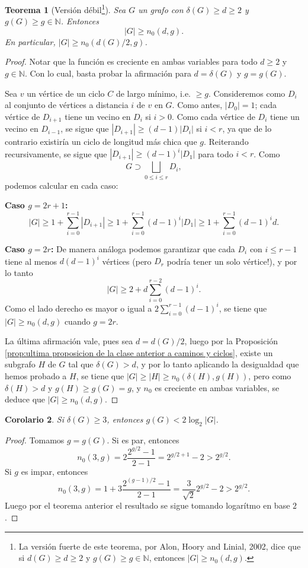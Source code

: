 \documentclass[12pt]{report}
\theoremstyle{plain}
\newtheorem{theorem}{Teorema}[section]
\newtheorem{corollary}[theorem]{Corolario}
\theoremstyle{definition}
\newcommand{\naturals}{\mathbb{N}}
\newcommand{\abs}[1]{\left \vert #1 \right \vert}
\begin{document}
\begin{theorem}[Versión débil\footnote{La versión fuerte de este teorema, por Alon, Hoory and Linial, 2002, dice que
si $d(G) \geq d \geq 2$ y $g(G) \geq g \in \naturals$, entonces $\abs G \geq n_0 (d,g)$.}]\label{th:version debil del teorema de Alon, Hoory y Lineal en 2002}
Sea $G$ un grafo con $\delta (G) \geq d \geq 2$ y $g(G) \geq g \in \naturals$. Entonces
\[
\abs G \geq n_0 (d,g).
\]
En particular, $\abs G \geq n_0 ( d(G)/2, g)$.
\end{theorem}
\begin{proof}
Notar que la función es creciente en ambas variables para todo $d \geq 2$ y $g \in \naturals$. Con lo cual, basta
probar la afirmación para $d = \delta(G)$ y $g = g(G)$.

Sea $v$ un vértice de un ciclo $C$ de largo mínimo, i.e. $\geq g$. Consideremos como $D_i$ al conjunto de vértices a distancia $i$ de $v$ en $G$. Como antes, $\abs {D_0} = 1$; cada vértice de $D_{i+1}$ tiene un vecino en $D_{i}$ si $i>0$. Como cada vértice de $D_i$ tiene un vecino en $D_{i-1}$, se sigue que $\abs{D_{i+1}}  \geq (d-1) \abs{D_i}$ si $i < r$, ya que de lo contrario existiría un ciclo de longitud más chica que $g$.
Reiterando recursivamente, se sigue que $\abs{D_{i+1}} \geq (d-1)^i \abs{D_1}$ para todo $i < r$. Como
$$
G \supset \bigsqcup_{0\leq i\leq r} D_i,
$$
podemos calcular en cada caso:

\textbf{Caso $g = 2 r +1$:}
$$
\abs G \geq  1 + \sum_{i=0}^{r-1} \abs{D_{i+1}} \geq 1 + \sum_{i=0}^{r-1} (d-1)^i \abs{D_1} \geq 1 + \sum_{i=0}^{r-1} (d-1)^i d.$$

\textbf{Caso $g = 2 r$:} De manera análoga podemos garantizar que cada $D_i$ con $i \leq r-1$ tiene al menos $d (d-1)^i$ vértices (pero $D_r$ podría tener un solo vértice!), y por lo tanto
\[
\abs{G} \geq 2 + d\sum_{i = 0}^{r-2} (d-1)^i.
\]
Como el lado derecho es mayor o igual a $2 \sum_{i = 0}^{r-1} (d-1)^i$, se tiene que $\abs G \geq n_0 (d, g)$ cuando $g = 2r$.

La última afirmación vale, pues sea $d = d(G)/2$, luego por la Proposición \ref{prop:ultima proposicion de la clase anterior a caminos y ciclos}, existe un subgrafo $H$ de $G$ tal que $\delta (G) > d$, y por lo tanto aplicando la desigualdad que hemos probado a $H$, se tiene que $\abs G \geq \abs H \geq n_0 (\delta(H),g(H))$, pero como $\delta (H) > d$ y $g(H) \geq g(G) = g$, y $n_0$ es creciente en ambas variables, se deduce que $\abs G \geq n_0 (d,g)$.

\end{proof}
\begin{corollary}\label{corolario:si delta(G) geq 3, entonces g(G) < 2 log_2 abs G}
Si $\delta(G) \geq 3$, entonces $g(G) < 2 \log_2 \abs G$.
\end{corollary}
\begin{proof}
Tomamos $g = g(G)$. Si es par, entonces
$$
n_0(3,g) = 2 \frac{2^{g/2}-1}{2  - 1} = 2^{g/2+1}-2 > 2^{g/2}.
$$
Si $g$ es impar, entonces
$$
n_0(3,g) = 1 + 3 \frac{2^{(g-1)/2}-1}{2-1} = \frac{3}{\sqrt 2} 2^{g/2} - 2 > 2^{g/2}.
$$
Luego por el teorema anterior el resultado se sigue tomando logarítmo en base $2$.
\end{proof}
\end{document}
